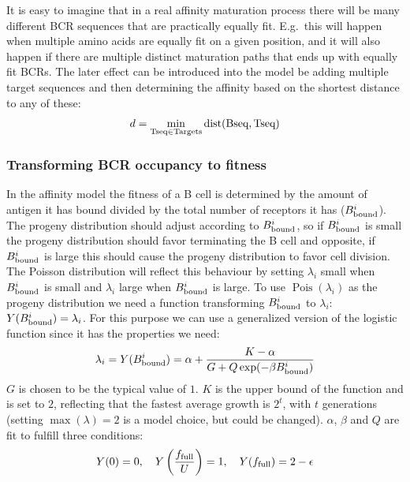 \clearpage
It is easy to imagine that in a real affinity maturation process there will be many different BCR sequences that are practically equally fit.
E.g.\ this will happen when multiple amino acids are equally fit on a given position, and it will also happen if there are multiple distinct maturation paths that ends up with equally fit BCRs.
The later effect can be introduced into the model be adding multiple target sequences and then determining the affinity based on the shortest distance to any of these:
$$
d = \mathop{\mathrm{\min}}\limits_{\text{Tseq} \in \text{Targets}} \operatorname{dist}(\text{Bseq}, \text{Tseq})
$$




\subsubsection{Transforming BCR occupancy to fitness}
In the affinity model the fitness of a B cell is determined by the amount of antigen it has bound divided by the total number of receptors it has ($B^i_{\text{bound}}$).
The progeny distribution should adjust according to $B^i_{\text{bound}}$, so if $B^i_{\text{bound}}$ is small the progeny distribution should favor terminating the B cell and opposite, if $B^i_{\text{bound}}$ is large this should cause the progeny distribution to favor cell division.
The Poisson distribution will reflect this behaviour by setting $\lambda_i$ small when $B^i_{\text{bound}}$ is small and $\lambda_i$ large when $B^i_{\text{bound}}$ is large.
To use $\operatorname{Pois}(\lambda_i)$ as the progeny distribution we need a function transforming $B^i_{\text{bound}}$ to $\lambda_i$: $Y(B^i_{\text{bound}}) = \lambda_i$.
For this purpose we can use a generalized version of the logistic function since it has the properties we need:
\begin{equation}
\lambda_i = Y(B^i_{\text{bound}}) = \alpha + \frac{K - \alpha}{G + Q \exp(-\beta B^i_{\text{bound}})}
  \label{eq:BA_trans}
\end{equation}
$G$ is chosen to be the typical value of $1$.
$K$ is the upper bound of the function and is set to $2$, reflecting that the fastest average growth is $2^t$, with $t$ generations (setting $\operatorname{max}(\lambda) = 2$ is a model choice, but could be changed).
$\alpha$, $\beta$ and $Q$ are fit to fulfill three conditions:
\begin{equation}
Y(0) = 0, \ \ \ Y \left(\frac{f_{\text{full}}}{U} \right) = 1, \ \ \ Y(f_{\text{full}}) = 2 - \epsilon
  \label{eq:BA_cond}
\end{equation}

